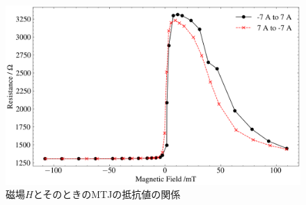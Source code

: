 \begin{figure}
	\centering
	\includegraphics[width=0.8\linewidth]{src/figures/result/result.png}
	\caption{磁場$H$とそのときのMTJの抵抗値の関係}\label{fig:result}
\end{figure}
